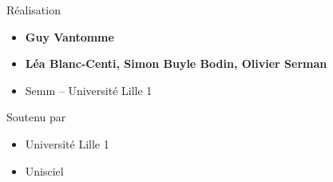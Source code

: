 \begin{frame}
\begin{minipage}{0.50\textwidth}
  \medskip

  Réalisation
  \begin{itemize}
    \item {\bf Guy Vantomme}
    \item {\bf \small Léa Blanc-Centi, Simon Buyle Bodin, Olivier Serman} 
    \item Semm -- Université Lille 1
  \end{itemize}

  \medskip

  Soutenu par 
  \begin{itemize}
    \item Université Lille 1
    \item Unisciel
  \end{itemize}

  \end{minipage}  



\end{frame}


